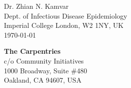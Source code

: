 


\clearpage
\begin{flushright}
  Dr. Zhian N. Kamvar\\
  Dept. of Infectious Disease Epidemiology\\
  Imperial College London, W2 1NY, UK\\
  \today
\end{flushright}

\textbf{The Carpentries}\\
c/o Community Initiatives\\
1000 Broadway, Suite \#480\\
Oakland, CA 94607, USA



